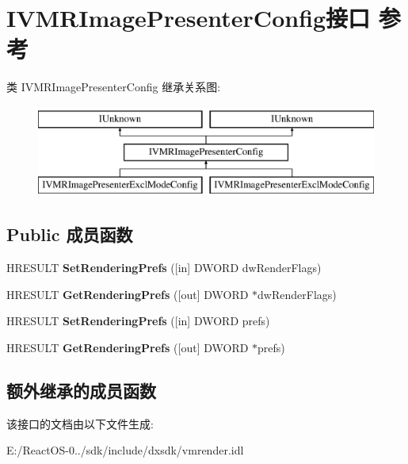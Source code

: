 \hypertarget{interface_i_v_m_r_image_presenter_config}{}\section{I\+V\+M\+R\+Image\+Presenter\+Config接口 参考}
\label{interface_i_v_m_r_image_presenter_config}
类 I\+V\+M\+R\+Image\+Presenter\+Config 继承关系图\+:\begin{figure}[H]
\begin{center}
\leavevmode
\includegraphics[height=3.000000cm]{interface_i_v_m_r_image_presenter_config}
\end{center}
\end{figure}
\subsection*{Public 成员函数}
\begin{DoxyCompactItemize}
\item 
\mbox{\label{interface_i_v_m_r_image_presenter_config_a7c1b12d88a11c2096f93f06a897a5fa8}} 
H\+R\+E\+S\+U\+LT {\bfseries Set\+Rendering\+Prefs} (\mbox{[}in\mbox{]} D\+W\+O\+RD dw\+Render\+Flags)
\item 
\mbox{\label{interface_i_v_m_r_image_presenter_config_afcdc0a0be315f4b5bb2c187142335762}} 
H\+R\+E\+S\+U\+LT {\bfseries Get\+Rendering\+Prefs} (\mbox{[}out\mbox{]} D\+W\+O\+RD $\ast$dw\+Render\+Flags)
\item 
\mbox{\label{interface_i_v_m_r_image_presenter_config_ad52ad29a7d2e467762a757a221e57f60}} 
H\+R\+E\+S\+U\+LT {\bfseries Set\+Rendering\+Prefs} (\mbox{[}in\mbox{]} D\+W\+O\+RD prefs)
\item 
\mbox{\label{interface_i_v_m_r_image_presenter_config_a146e3d8750f898eb231afa06340ed785}} 
H\+R\+E\+S\+U\+LT {\bfseries Get\+Rendering\+Prefs} (\mbox{[}out\mbox{]} D\+W\+O\+RD $\ast$prefs)
\end{DoxyCompactItemize}
\subsection*{额外继承的成员函数}


该接口的文档由以下文件生成\+:\begin{DoxyCompactItemize}
\item 
E\+:/\+React\+O\+S-\/0../sdk/include/dxsdk/vmrender.\+idl\end{DoxyCompactItemize}
